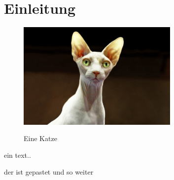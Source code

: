 \chapter{Einleitung}
\begin{figure}[htb]
	\centering
		\includegraphics[width=0.7\textwidth]{images/cat.jpg}
	\caption{Eine Katze} \autocite{book}
\end{figure}
ein text..

der ist gepastet \textcite{id} und so weiter \autocite{id2}